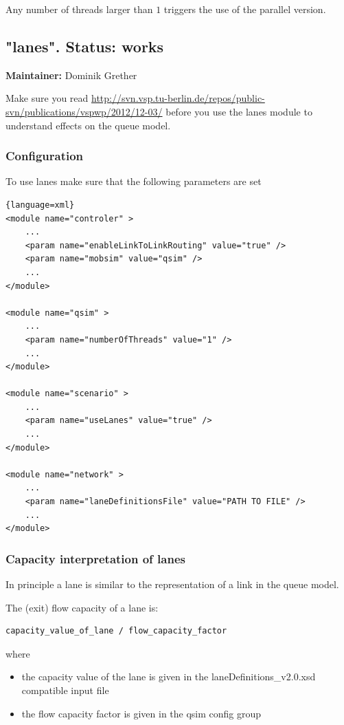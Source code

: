 Any number of threads larger than $1$ triggers the use of the parallel version.

\vfill\eject
\subsection{"lanes". Status: works}

\textbf{Maintainer:} Dominik Grether

Make sure you read \url{http://svn.vsp.tu-berlin.de/repos/public-svn/publications/vspwp/2012/12-03/} before you use the lanes module to understand effects on the queue model.

\subsubsection{Configuration}

To use lanes make sure that the following parameters are set

\begin{lstlisting}{language=xml}
<module name="controler" >	
	...
	<param name="enableLinkToLinkRouting" value="true" />
	<param name="mobsim" value="qsim" />
	...
</module>

<module name="qsim" >
	...
	<param name="numberOfThreads" value="1" />
	...
</module>

<module name="scenario" >
	...
	<param name="useLanes" value="true" />
	...
</module>

<module name="network" >
	...
	<param name="laneDefinitionsFile" value="PATH TO FILE" />
	...
</module>
\end{lstlisting}


\subsubsection{Capacity interpretation of lanes}

In principle a lane is similar to the representation of a link in the queue model. 

The (exit) flow capacity of a lane is:

\begin{lstlisting}
capacity_value_of_lane / flow_capacity_factor
\end{lstlisting}

where
\begin{itemize}
	\item the capacity value of the lane is given in the laneDefinitions\_v2.0.xsd compatible input file
	\item the flow capacity factor is given in the qsim config group
\end{itemize}

